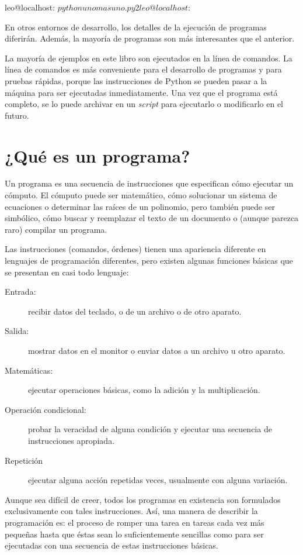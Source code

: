 \begin{pyconcode}
leo@localhost: $ python unomasuno.py
2
leo@localhost: $
\end{pyconcode}

En otros entornos de desarrollo, los detalles de la ejecución de
programas diferirán. Además, la mayoría de programas son más
interesantes que el anterior.

La mayoría de ejemplos en este libro son ejecutados en la línea de
comandos. La línea de comandos es más conveniente para el desarrollo de
programas y para pruebas rápidas, porque las instrucciones de Python 
se pueden pasar a la máquina para ser ejecutadas inmediatamente. 
Una vez que el programa está completo, se lo puede
archivar en un \textit{script} para ejecutarlo o modificarlo en el futuro.

\section{¿Qué es un programa?}

Un programa es una secuencia de instrucciones que especifican cómo
ejecutar un cómputo. El cómputo puede ser 
matemático, cómo solucionar un sistema de ecuaciones o determinar
las raíces de un polinomio, pero también puede ser 
simbólico, cómo buscar y reemplazar el texto de un
documento o (aunque parezca raro) compilar un programa.


Las instrucciones (comandos, órdenes) tienen una apariencia
diferente en lenguajes de programación diferentes, pero existen
algunas funciones básicas que se presentan en casi todo lenguaje:

\begin{description}
	\item[Entrada:] recibir datos del teclado, o de un archivo o de otro
	aparato.
	\item[Salida:] mostrar datos en el monitor o enviar datos a un
	archivo u otro aparato.
	\item[Matemáticas:] ejecutar operaciones básicas, como la adición y la 
	multiplicación.
	\item[Operación condicional:] probar la veracidad de alguna
	condición y ejecutar una secuencia de instrucciones apropiada.
	\item[Repetición] ejecutar alguna acción repetidas veces,
	usualmente con alguna variación.
\end{description}

Aunque sea difícil de creer, todos los programas en existencia son
formulados exclusivamente con tales instrucciones. Así, una manera
de describir la programación es: el proceso de romper una tarea en
tareas cada vez más pequeñas hasta que éstas sean lo
suficientemente sencillas como para ser ejecutadas con una secuencia
de estas instrucciones básicas.

